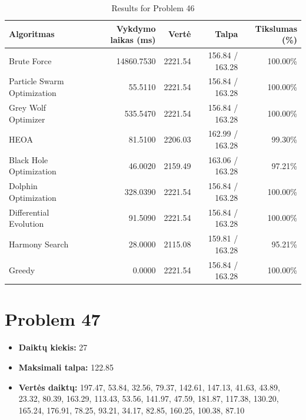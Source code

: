 \documentclass[a4paper,11pt]{article}
\begin{document}
\begin{table}[h!]
\centering
\begin{tabular}{lrrrr}
\toprule
\textbf{Algoritmas} & \textbf{Vykdymo laikas (ms)} & \textbf{Vertė} & \textbf{Talpa} & \textbf{Tikslumas (\%)} \\
\midrule
Brute Force & 14860.7530 & 2221.54 & 156.84 / 163.28 & 100.00\% \\
Particle Swarm Optimization & 55.5110 & 2221.54 & 156.84 / 163.28 & 100.00\% \\
Grey Wolf Optimizer & 535.5470 & 2221.54 & 156.84 / 163.28 & 100.00\% \\
HEOA & 81.5100 & 2206.03 & 162.99 / 163.28 & 99.30\% \\
Black Hole Optimization & 46.0020 & 2159.49 & 163.06 / 163.28 & 97.21\% \\
Dolphin Optimization & 328.0390 & 2221.54 & 156.84 / 163.28 & 100.00\% \\
Differential Evolution & 91.5090 & 2221.54 & 156.84 / 163.28 & 100.00\% \\
Harmony Search & 28.0000 & 2115.08 & 159.81 / 163.28 & 95.21\% \\
Greedy & 0.0000 & 2221.54 & 156.84 / 163.28 & 100.00\% \\
\bottomrule
\end{tabular}
\caption{Results for Problem 46}
\end{table}
\clearpage

\section*{Problem 47}
\begin{itemize}
    \item \textbf{Daiktų kiekis:} 27
    \item \textbf{Maksimali talpa:} 122.85
    \item \textbf{Vertės daiktų:} 197.47, 53.84, 32.56, 79.37, 142.61, 147.13, 41.63, 43.89, 23.32, 80.39, 163.29, 113.43, 53.56, 141.97, 47.59, 181.87, 117.38, 130.20, 165.24, 176.91, 78.25, 93.21, 34.17, 82.85, 160.25, 100.38, 87.10
\end{itemize}
\end{document}
